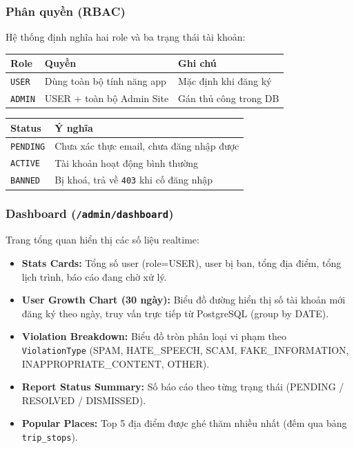 \documentclass[12pt,a4paper]{article}
\begin{document}
\subsubsection{Phân quyền (RBAC)}

Hệ thống định nghĩa hai role và ba trạng thái tài khoản:

\begin{center}
\begin{tabular}{lll}
  \toprule
  \textbf{Role} & \textbf{Quyền} & \textbf{Ghi chú} \\
  \midrule
  \texttt{USER}  & Dùng toàn bộ tính năng app & Mặc định khi đăng ký \\
  \texttt{ADMIN} & USER + toàn bộ Admin Site   & Gán thủ công trong DB \\
  \bottomrule
\end{tabular}
\end{center}

\begin{center}
\begin{tabular}{ll}
  \toprule
  \textbf{Status} & \textbf{Ý nghĩa} \\
  \midrule
  \texttt{PENDING} & Chưa xác thực email, chưa đăng nhập được \\
  \texttt{ACTIVE}  & Tài khoản hoạt động bình thường \\
  \texttt{BANNED}  & Bị khoá, trả về \texttt{403} khi cố đăng nhập \\
  \bottomrule
\end{tabular}
\end{center}

\subsubsection{Dashboard (\texttt{/admin/dashboard})}

Trang tổng quan hiển thị các số liệu realtime:

\begin{itemize}
  \item \textbf{Stats Cards:} Tổng số user (role=USER), user bị ban, tổng
        địa điểm, tổng lịch trình, báo cáo đang chờ xử lý.
  \item \textbf{User Growth Chart (30 ngày):} Biểu đồ đường hiển thị số
        tài khoản mới đăng ký theo ngày, truy vấn trực tiếp từ PostgreSQL
        (group by DATE).
  \item \textbf{Violation Breakdown:} Biểu đồ tròn phân loại vi phạm theo
        \texttt{ViolationType} (SPAM, HATE\_SPEECH, SCAM, FAKE\_INFORMATION,
        INAPPROPRIATE\_CONTENT, OTHER).
  \item \textbf{Report Status Summary:} Số báo cáo theo từng trạng thái
        (PENDING / RESOLVED / DISMISSED).
  \item \textbf{Popular Places:} Top 5 địa điểm được ghé thăm nhiều nhất
        (đếm qua bảng \texttt{trip\_stops}).
\end{itemize}
\end{document}
